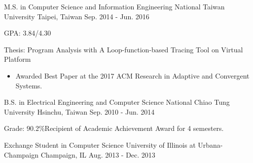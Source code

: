 

\begin{cventries}

  \cventry
    {M.S. in Computer Science and Information Engineering} %
    {National Taiwan University} %
    {Taipei, Taiwan} %
    {Sep. 2014 - Jun. 2016} %
    {
      \begin{cvitems} %
        \item {GPA: 3.84/4.30}
        \item {Thesis: Program Analysis with A Loop-function-based Tracing Tool
          on Virtual Platform}
          \begin{itemize}
            \item Awarded Best Paper at the 2017 ACM Research in Adaptive and Convergent Systems.
          \end{itemize}
      \end{cvitems}
    }

  \cventry
    {B.S. in Electrical Engineering and Computer Science} %
    {National Chiao Tung University} %
    {Hsinchu, Taiwan} %
    {Sep. 2010 - Jun. 2014} %
    {
      \begin{cvitems} %
        \item {Grade: 90.2\%{\enskip\cdotp\enskip}Recipient of Academic Achievement Award for 4 semesters.}
      \end{cvitems}
    }

  \cventry
    {Exchange Student in Computer Science} %
    {University of Illinois at Urbana-Champaign} %
    {Champaign, IL} %
    {Aug. 2013 - Dec. 2013} %
    {
    }

\end{cventries}
